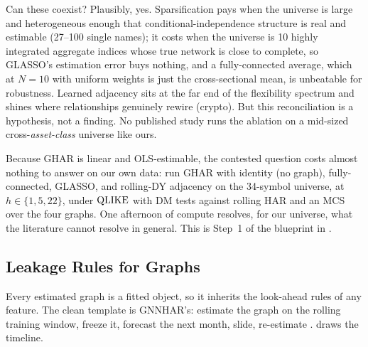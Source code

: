 Can these coexist? Plausibly, yes. Sparsification pays when the universe is large and heterogeneous enough that conditional-independence structure is real and estimable (27--100 single names); it costs when the universe is 10 highly integrated aggregate indices whose true network is close to complete, so GLASSO's estimation error buys nothing, and a fully-connected average, which at $N = 10$ with uniform weights is just the cross-sectional mean, is unbeatable for robustness. Learned adjacency sits at the far end of the flexibility spectrum and shines where relationships genuinely rewire (crypto). But this reconciliation is a hypothesis, not a finding. No published study runs the ablation on a mid-sized cross-\emph{asset-class} universe like ours.

\begin{keyidea}
Because GHAR is linear and OLS-estimable, the contested question costs almost nothing to answer on our own data: run GHAR with identity (no graph), fully-connected, GLASSO, and rolling-DY adjacency on the 34-symbol universe, at $h \in \{1, 5, 22\}$, under $\operatorname{QLIKE}$ with DM tests against rolling HAR and an MCS over the four graphs. One afternoon of compute resolves, for our universe, what the literature cannot resolve in general. This is Step~1 of the blueprint in .
\end{keyidea}

\subsection{Leakage Rules for Graphs}\label{sec:gnn:graph-leakage}

Every estimated graph is a fitted object, so it inherits the look-ahead rules of any feature. The clean template is GNNHAR's: estimate the graph on the rolling training window, freeze it, forecast the next month, slide, re-estimate \citep[p.~14]{ZhangCucuringuDong2023}.  draws the timeline.

